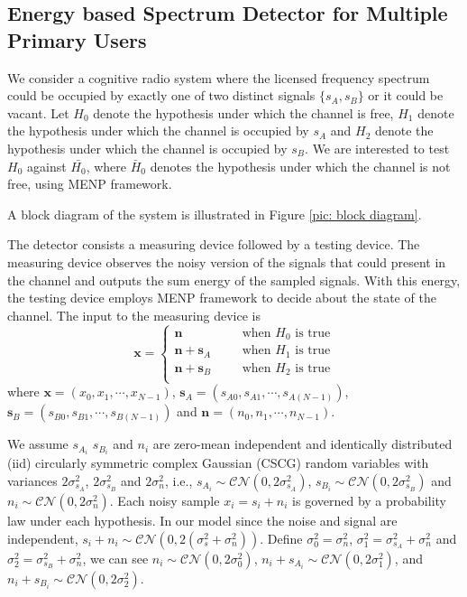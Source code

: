 \subsection{Energy based Spectrum Detector for Multiple Primary Users}
We consider a cognitive radio system where the licensed frequency spectrum could be occupied by exactly one of two distinct signals $\{s_A, s_B\}$ or it could be vacant. Let $H_0$ denote the hypothesis under which the channel is free, ${H}_1$ denote the hypothesis under which the channel is occupied by $s_A$ and ${H}_2$ denote the hypothesis under which the channel is occupied by $s_B$. We are interested to test $H_0$ against $\bar{{H}_0}$, where $\bar{H}_0$ denotes the hypothesis under which the channel is not free, using MENP framework.

A block diagram of the system is illustrated in Figure \ref{pic: block diagram}.



The detector consists a measuring device followed by a testing device. 
The measuring device observes the noisy version of the signals that could present in the channel and outputs the sum energy of the sampled signals.
With this energy, the testing device employs MENP framework to decide about the state of the channel.
The input to the measuring device is 
\begin{equation}
  \mathbf{x} = \begin{cases}
	\mathbf{n}\;\;\;\;\;\;&\text{when $H_0$ is true}\\
	\mathbf{n}+\mathbf{s}_A\;\;\;\;\;\;&\text{when $H_1$ is true}\\
	\mathbf{n}+\mathbf{s}_B\;\;\;\;\;\;&\text{when $H_2$ is true}\\
  \end{cases}
  \label{equ:1222n0}
\end{equation}
where 
	$\mathbf{x} = (x_0, x_1, \cdots, x_{N-1})$,
	$\mathbf{s}_A = (s_{A0}, s_{A1}, \cdots, s_{A(N-1)})$, 
	$\mathbf{s}_B = (s_{B0}, s_{B1}, \cdots, s_{B(N-1)})$ and 
	$\mathbf{n} = (n_{0}, n_{1}, \cdots, n_{N-1})$. 

We assume  $s_{A_i}$ $s_{B_i}$ and $n_i$ are zero-mean independent and identically distributed (iid) circularly symmetric complex Gaussian (CSCG) random variables with variances $2\sigma_{s_A}^2$, $2\sigma_{s_B}^2$ and $2\sigma_{n}^2$, i.e., $s_{A_i} \sim \mathcal{CN}(0, 2\sigma_{s_A}^2)$, $s_{B_i} \sim \mathcal{CN}(0, 2\sigma_{s_B}^2)$ and $n_i \sim \mathcal{CN}(0, 2\sigma_{n}^2)$.
Each noisy sample $x_i = s_i + n_i$ is governed by a probability law under each hypothesis. In our model
since the noise and signal are independent, $s_i+ n_i \sim \mathcal{CN}(0, 2(\sigma_{s}^2 + \sigma_n^2))$.  Define $\sigma_0^2 = \sigma_n^2$, $\sigma_1^2 = \sigma_{s_A}^2 + \sigma_n^2$ and $\sigma_2^2 = \sigma_{s_B}^2 + \sigma_n^2$, we can see
$  n_i \sim \mathcal{CN}(0, 2\sigma_0^2)$, 
$  n_i + s_{A_i} \sim \mathcal{CN}(0, 2\sigma_1^2) $, and 
$   n_i + s_{B_i}\sim \mathcal{CN}(0, 2\sigma_2^2) $.

